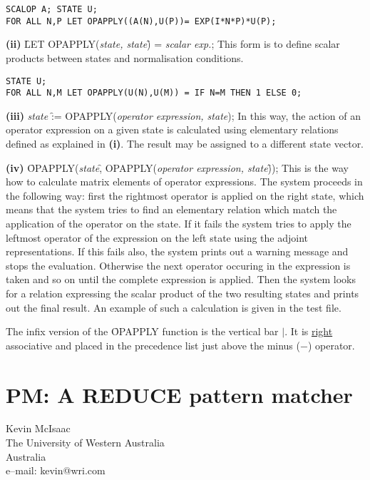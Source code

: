 \documentclass[11pt,letterpaper]{book}
\makeatletter
\newcommand{\underscore}{\_}
\newcommand{\ttindex}[1]{{\renewcommand{\_}{\protect\underscore}%
                          \index{#1@{\tt #1}}}}
\makeatother
\begin{document}
{\small\begin{verbatim}
SCALOP A; STATE U;
FOR ALL N,P LET OPAPPLY((A(N),U(P))= EXP(I*N*P)*U(P);
\end{verbatim}}

{\bf (ii)} \f{LET OPAPPLY(}{\it state, state}\f{) =} {\it scalar exp.};
This form is to define scalar products between states and normalisation
conditions.

{\small\begin{verbatim}
STATE U;
FOR ALL N,M LET OPAPPLY(U(N),U(M)) = IF N=M THEN 1 ELSE 0;
\end{verbatim}}

{\bf (iii)} {\it state} \f{:= OPAPPLY(}{\it operator expression, state});
 In this way, the action of an operator expression on a given state
is calculated using elementary relations defined as explained in {\bf
(i)}. The result may be assigned to a different state vector.

{\bf (iv)} \f{OPAPPLY(}{\it state}\f{, OPAPPLY(}{\it operator expression,
state}\f{))}; This is the way how to calculate matrix elements of
operator
expressions. The system proceeds in the following way: first the
rightmost operator is applied on the right state, which means that the
system tries
to find an elementary relation which match the application of the
operator on the state. If it fails
the system tries to apply the leftmost operator of the expression on the
left state using the adjoint representations. If this fails also,
the system prints out a warning message and stops the evaluation.
Otherwise the next operator occuring in the expression is
taken and so on until the complete expression is applied.  Then the
system
looks for a relation expressing the scalar product of the two
resulting states and prints out the final result. An example of such
a calculation is given in the test file.

The infix version of the \f{OPAPPLY} function is the vertical bar
$\mid$. It is \underline{right} associative and placed in the
precedence
list just above the minus ($-$) operator.

\chapter{PM: A REDUCE pattern matcher}
\label{PM}

{\footnotesize
\begin{center}
Kevin McIsaac \\
The University of Western Australia \\
Australia\\[0.05in]
e--mail: kevin@wri.com
\end{center}
}
\ttindex{PM}
\end{document}
